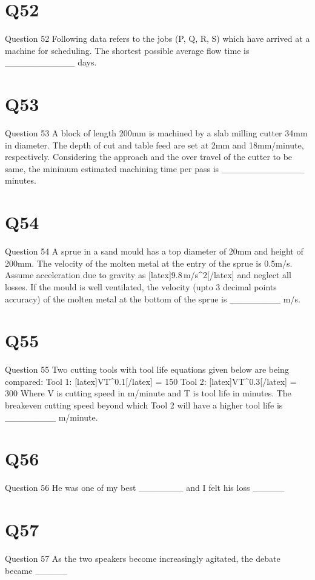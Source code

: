 \section*{Q52}
Question 52 Following data refers to the jobs (P, Q, R, S) which have arrived at a machine for scheduling. The shortest possible average flow time is \_\_\_\_\_\_\_\_\_\_\_ days.

\section*{Q53}
Question 53 A block of length 200mm is machined by a slab milling cutter 34mm in diameter. The depth of cut and table feed are set at 2mm and 18mm/minute, respectively. Considering the approach and the over travel of the cutter to be same, the minimum estimated machining time per pass is \_\_\_\_\_\_\_\_\_\_\_\_\_ minutes.

\section*{Q54}
Question 54 A sprue in a sand mould has a top diameter of 20mm and height of 200mm. The velocity of the molten metal at the entry of the sprue is 0.5m/s. Assume acceleration due to gravity as [latex]9.8\,m/s^{2}[/latex] and neglect all losses. If the mould is well ventilated, the velocity (upto 3 decimal points accuracy) of the molten metal at the bottom of the sprue is \_\_\_\_\_\_\_\_ m/s.

\section*{Q55}
Question 55 Two cutting tools with tool life equations given below are being compared: Tool 1: [latex]VT^{0.1}[/latex]  = 150 Tool 2: [latex]VT^{0.3}[/latex]  = 300 Where V is cutting speed in m/minute and T is tool life in minutes. The breakeven cutting speed beyond which Tool 2 will have a higher tool life is \_\_\_\_\_\_\_\_ m/minute.

\section*{Q56}
Question 56 He was one of my best \_\_\_\_\_\_\_ and I felt his loss \_\_\_\_\_

\section*{Q57}
Question 57 As the two speakers become increasingly agitated, the debate became \_\_\_\_\_


